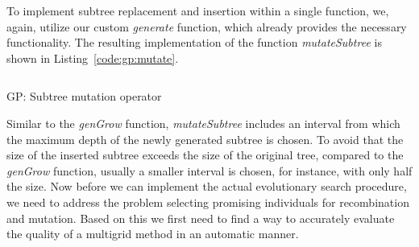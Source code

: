 To implement subtree replacement and insertion within a single function, we, again, utilize our custom \emph{generate} function, which already provides the necessary functionality.
The resulting implementation of the function \emph{mutateSubtree} is shown in Listing~\ref{code:gp:mutate}.
\begin{listing}[!htb]
	\inputminted{python}{evostencils/gp/mutate.py}
	\caption{GP: Subtree mutation operator}
	\label{code:gp:mutate}
\end{listing}
Similar to the \emph{genGrow} function, \emph{mutateSubtree} includes an interval from which the maximum depth of the newly generated subtree is chosen.
To avoid that the size of the inserted subtree exceeds the size of the original tree, compared to the \emph{genGrow} function, usually a smaller interval is chosen, for instance, with only half the size.
Now before we can implement the actual evolutionary search procedure, we need to address the problem selecting promising individuals for recombination and mutation.
Based on this we first need to find a way to accurately evaluate the quality of a multigrid method in an automatic manner.

